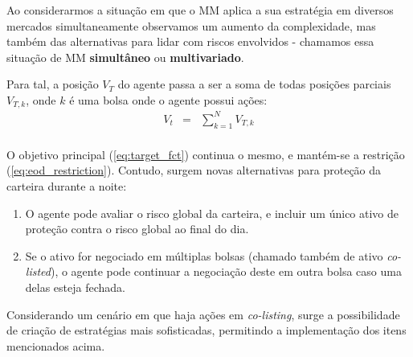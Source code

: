 Ao considerarmos a situação em que o MM aplica a sua estratégia em diversos mercados simultaneamente observamos um aumento da complexidade, mas também das alternativas para lidar com riscos envolvidos - chamamos essa situação de MM \textbf{simultâneo} ou \textbf{multivariado}.

Para tal, a posição $V_{T}$ do agente passa a ser a soma de todas posições parciais $V_{T, k}$, onde $k$ é uma bolsa onde o agente possui ações:
\begin{eqnarray*}
    V_t &=& \sum_{k=1}^N V_{T, k}\\
\end{eqnarray*}

O objetivo principal (\ref{eq:target_fct}) continua o mesmo, e mantém-se a restrição (\ref{eq:eod_restriction}). Contudo, surgem novas alternativas para proteção da carteira durante a noite:

\begin{enumerate}
    \item O agente pode avaliar o risco global da carteira, e incluir um único ativo de proteção contra o risco global ao final do dia.
    \item Se o ativo for negociado em múltiplas bolsas (chamado também de ativo \textit{co-listed}), o agente pode continuar a negociação deste em outra bolsa caso uma delas esteja fechada.
\end{enumerate}

Considerando um cenário em que haja ações em \textit{co-listing}, surge a possibilidade de criação de estratégias mais sofisticadas, permitindo a implementação dos itens mencionados acima.
